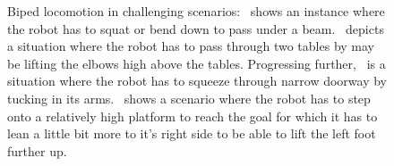\documentclass{article}
\begin{document}
\begin{figure}[t]%
  \centering%
  \caption{%
    Biped locomotion in challenging scenarios: 
  ~shows an instance where the robot has to squat or bend down to pass under a beam.
  ~depicts a situation where the robot has to pass through two tables by may be lifting the elbows high above the tables.
  Progressing further, ~is a situation where the robot has to squeeze through narrow doorway by tucking in its arms.
  ~shows a scenario where the robot has to step onto a relatively high platform to reach the goal for which it has to lean a little bit more to it's right side to be able to lift the left foot further up.
  }%
  \label{fig:biped_locomotion}%
\end{figure}
\end{document}
